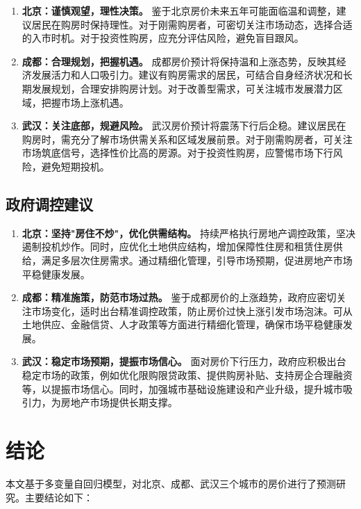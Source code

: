 \documentclass[12pt,a4paper]{article}
\begin{document}
\begin{enumerate}
    \item \textbf{北京：谨慎观望，理性决策。} 鉴于北京房价未来五年可能面临温和调整，建议居民在购房时保持理性。对于刚需购房者，可密切关注市场动态，选择合适的入市时机。对于投资性购房，应充分评估风险，避免盲目跟风。
    \item \textbf{成都：合理规划，把握机遇。} 成都房价预计将保持温和上涨态势，反映其经济发展活力和人口吸引力。建议有购房需求的居民，可结合自身经济状况和长期发展规划，合理安排购房计划。对于改善型需求，可关注城市发展潜力区域，把握市场上涨机遇。
    \item \textbf{武汉：关注底部，规避风险。} 武汉房价预计将震荡下行后企稳。建议居民在购房时，需充分了解市场供需关系和区域发展前景。对于刚需购房者，可关注市场筑底信号，选择性价比高的房源。对于投资性购房，应警惕市场下行风险，避免短期投机。
\end{enumerate}

\subsection{政府调控建议}

\begin{enumerate}
    \item \textbf{北京：坚持"房住不炒"，优化供需结构。} 持续严格执行房地产调控政策，坚决遏制投机炒作。同时，应优化土地供应结构，增加保障性住房和租赁住房供给，满足多层次住房需求。通过精细化管理，引导市场预期，促进房地产市场平稳健康发展。
    \item \textbf{成都：精准施策，防范市场过热。} 鉴于成都房价的上涨趋势，政府应密切关注市场变化，适时出台精准调控政策，防止房价过快上涨引发市场泡沫。可从土地供应、金融信贷、人才政策等方面进行精细化管理，确保市场平稳健康发展。
    \item \textbf{武汉：稳定市场预期，提振市场信心。} 面对房价下行压力，政府应积极出台稳定市场的政策，例如优化限购限贷政策、提供购房补贴、支持房企合理融资等，以提振市场信心。同时，加强城市基础设施建设和产业升级，提升城市吸引力，为房地产市场提供长期支撑。
\end{enumerate}

\section{结论}

本文基于多变量自回归模型，对北京、成都、武汉三个城市的房价进行了预测研究。主要结论如下：
\end{document}
